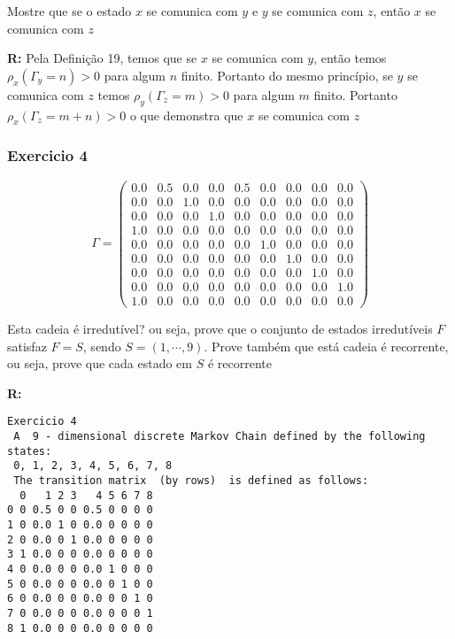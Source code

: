 \documentclass[
]{article}
\begin{document}
Mostre que se o estado \(x\) se comunica com \(y\) e \(y\) se comunica
com \(z\), então \(x\) se comunica com \(z\)

\textbf{R:} Pela Definição 19, temos que se \(x\) se comunica com \(y\),
então temos \(\rho_{x}(\Gamma_{y}=n)>0\) para algum \(n\) finito.
Portanto do mesmo princípio, se \(y\) se comunica com \(z\) temos
\(\rho_{y}(\Gamma_{z}=m)>0\) para algum \(m\) finito. Portanto
\(\rho_{x}(\Gamma_{z}=m+n)>0\) o que demonstra que \(x\) se comunica com
\(z\)

\hypertarget{exercicio-4}{%
\subsubsection{Exercicio 4}\label{exercicio-4}}

\[\Gamma = \begin{pmatrix}
0.0 & 0.5 & 0.0 & 0.0 & 0.5 & 0.0 & 0.0 & 0.0 & 0.0 \\
0.0 & 0.0 & 1.0 & 0.0 & 0.0 & 0.0 & 0.0 & 0.0 & 0.0 \\
0.0 & 0.0 & 0.0 & 1.0 & 0.0 & 0.0 & 0.0 & 0.0 & 0.0 \\
1.0 & 0.0 & 0.0 & 0.0 & 0.0 & 0.0 & 0.0 & 0.0 & 0.0 \\
0.0 & 0.0 & 0.0 & 0.0 & 0.0 & 1.0 & 0.0 & 0.0 & 0.0 \\
0.0 & 0.0 & 0.0 & 0.0 & 0.0 & 0.0 & 1.0 & 0.0 & 0.0 \\
0.0 & 0.0 & 0.0 & 0.0 & 0.0 & 0.0 & 0.0 & 1.0 & 0.0 \\
0.0 & 0.0 & 0.0 & 0.0 & 0.0 & 0.0 & 0.0 & 0.0 & 1.0 \\
1.0 & 0.0 & 0.0 & 0.0 & 0.0 & 0.0 & 0.0 & 0.0 & 0.0
\end{pmatrix}\]

Esta cadeia é irredutível? ou seja, prove que o conjunto de estados
irredutíveis \(F\) satisfaz \(F=S\), sendo \(S=(1,\cdots ,9)\). Prove
também que está cadeia é recorrente, ou seja, prove que cada estado em
\(S\) é recorrente

\textbf{R:}

\begin{verbatim}
Exercicio 4 
 A  9 - dimensional discrete Markov Chain defined by the following states: 
 0, 1, 2, 3, 4, 5, 6, 7, 8 
 The transition matrix  (by rows)  is defined as follows: 
  0   1 2 3   4 5 6 7 8
0 0 0.5 0 0 0.5 0 0 0 0
1 0 0.0 1 0 0.0 0 0 0 0
2 0 0.0 0 1 0.0 0 0 0 0
3 1 0.0 0 0 0.0 0 0 0 0
4 0 0.0 0 0 0.0 1 0 0 0
5 0 0.0 0 0 0.0 0 1 0 0
6 0 0.0 0 0 0.0 0 0 1 0
7 0 0.0 0 0 0.0 0 0 0 1
8 1 0.0 0 0 0.0 0 0 0 0
\end{verbatim}
\end{document}

